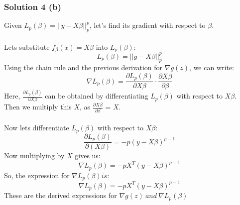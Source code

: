 \documentclass{assignment}
\begin{document}
\begin{problem}
\subsubsection*{Solution 4 (b)}
\noindent Given $L_p(\beta) = || y - X\beta ||_p^p$, let's find its gradient with respect to $\beta$. \\
\\
Lets substitute $f_\beta(x) = X\beta$ into $L_p(\beta)$:
\begin{equation}
    L_p(\beta) = ||y-X\beta||^p_p
\end{equation}
Using the chain rule and the previous derivation for $\nabla g(z)$, we can write:
\begin{equation}
    \nabla L_p(\beta) = \frac{\partial L_p(\beta)}{\partial X\beta} \cdot \frac{\partial X\beta}{\partial \beta}
\end{equation}
Here, $\frac{\partial L_p(\beta)}{\partial X\beta}$ can be obtained by differentiating $L_p(\beta)$ with respect to $X\beta$.\\ Then we multiply this $X$, as $\frac{\partial X\beta}{\partial\beta}$ = $X$.
\\
\\
Now lets differentiate $L_p(\beta)$ with respect to $X\beta$:
\begin{equation}
    \frac{\partial L_p(\beta)}{\partial(X\beta)} = -p(y-X\beta)^{p-1}
\end{equation}
Now multiplying by $X$ gives us:
\begin{equation}
    \nabla L_p(\beta) = -pX^T(y-X\beta)^{p-1}
\end{equation}
So, the expression for $\nabla L_p(\beta) is:$
\begin{equation}
    \nabla L_p(\beta) = -pX^T(y-X\beta)^{p-1}
\end{equation}
These are the derived expressions for $\nabla g(z)\ and\ \nabla L_p(\beta)$
\end{problem}
\end{document}
